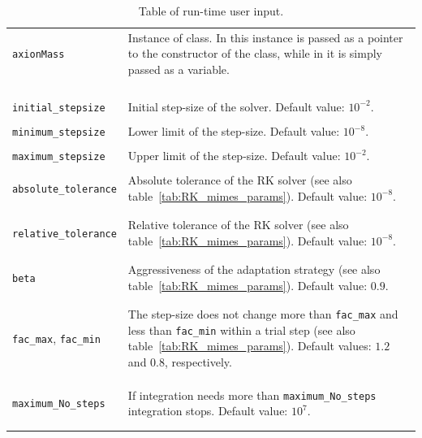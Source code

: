 \documentclass[11pt,a4paper]{article}
\begin{document}
\begin{table}[h!]
\begin{tabular}{l l}
		{\tt axionMass} & \multirow{1}{12cm}{ Instance of \cppin{mimes::AxionMass<LD>} class. In \CPP this instance is passed as a pointer to the constructor
		of the \cppin{mimes::Axion<LD,Solver,Method>} class, while in \PY it is simply passed as a variable.}\\ \\  \\ \\
		\hline\\[-0.4cm]

		{\tt initial\_stepsize} &  Initial step-size of the solver. Default value: $10^{-2}$.\\ 
		\hline\\[-0.4cm]

		{\tt minimum\_stepsize} & Lower limit of the step-size. Default value:  $10^{-8}$.\\
		\hline\\[-0.4cm]

		{\tt maximum\_stepsize} & Upper limit of the step-size. Default value:  $10^{-2}$.\\
		\hline\\[-0.4cm]

		{\tt absolute\_tolerance} & \multirow{1}{12cm}{Absolute tolerance of the RK solver	(see also table~\ref{tab:RK_mimes_params}).  Default value:  $10^{-8}$.}\\\\
		\hline\\[-0.4cm]

		{\tt relative\_tolerance} & \multirow{1}{12cm}{Relative tolerance of the RK solver	(see also table~\ref{tab:RK_mimes_params}).  Default value:  $10^{-8}$.}\\\\
		\hline\\[-0.4cm]
		
		{\tt beta} & \multirow{1}{12cm}{Aggressiveness of the adaptation strategy	(see also table~\ref{tab:RK_mimes_params}).  Default value:  $0.9$.}\\\\
		\hline\\[-0.4cm]

		{\tt fac\_max}, {\tt fac\_min} &\multirow{1}{12cm}{The step-size does not change more than {\tt fac\_max} and less than {\tt fac\_min} within a trial step (see also table~\ref{tab:RK_mimes_params}). Default values: $1.2$ and $0.8$, respectively.} \\ \\ \\ 
		\hline\\[-0.4cm]
		
		{\tt maximum\_No\_steps} & \multirow{1}{12cm}{If integration needs more than {\tt maximum\_No\_steps} integration stops. Default value: $10^7$.}\\\\
		\hline\\[-0.4cm]
	\end{tabular}
	\caption{Table of run-time user input.}
	\label{tab:run_time-input}
\end{table}
		
\end{document}
